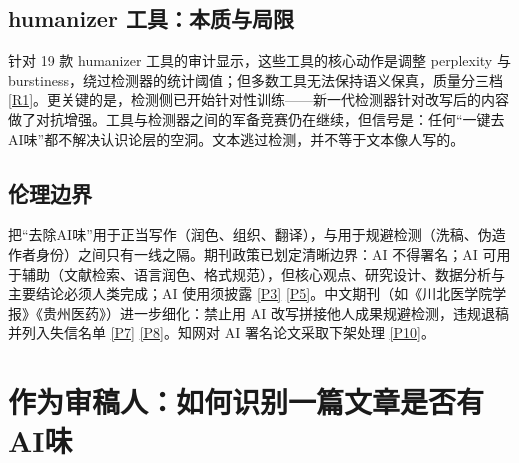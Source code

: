 \documentclass[10pt,a4paper]{ctexart}
\begin{document}
\begin{justifying}
\subsection{humanizer 工具：本质与局限}

针对 19 款 humanizer 工具的审计显示，这些工具的核心动作是调整 perplexity 与 burstiness，绕过检测器的统计阈值；但多数工具无法保持语义保真，质量分三档 \href{https://arxiv.org/abs/2501.03437}{[R1]}。更关键的是，检测侧已开始针对性训练——新一代检测器针对改写后的内容做了对抗增强。工具与检测器之间的军备竞赛仍在继续，但信号是：任何“一键去AI味”都不解决认识论层的空洞。文本逃过检测，并不等于文本像人写的。

\subsection{伦理边界}

把“去除AI味”用于正当写作（润色、组织、翻译），与用于规避检测（洗稿、伪造作者身份）之间只有一线之隔。期刊政策已划定清晰边界：AI 不得署名；AI 可用于辅助（文献检索、语言润色、格式规范），但核心观点、研究设计、数据分析与主要结论必须人类完成；AI 使用须披露 \href{https://onlinelibrary.wiley.com/pb-assets/assets/27711757/Generative-AI-Policy-1743486382650.pdf}{[P3]} \href{https://www.elsevier.cn/about/policies-and-standards/generative-ai-policies-for-journals/}{[P5]}。中文期刊（如《川北医学院学报》《贵州医药》）进一步细化：禁止用 AI 改写拼接他人成果规避检测，违规退稿并列入失信名单 \href{https://www.nsmc.edu.cn/xbbjb/info/1222/4071.htm}{[P7]} \href{http://gzyi.cbpt.cnki.net/portal/journal/portal/client/news/f5b426920bb15af72f52d1d7c62bf3a0}{[P8]}。知网对 AI 署名论文采取下架处理 \href{https://www.cernet.edu.cn/rd/zui_jin_geng_xin/202607/t20260716_2756633.shtml}{[P10]}。

\end{justifying}

\section{作为审稿人：如何识别一篇文章是否有AI味}
\end{document}
